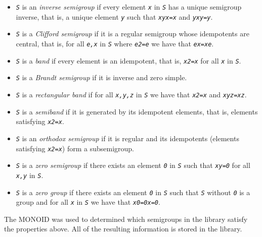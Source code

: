 \documentclass[a4paper,11pt]{report}
\begin{document}
{{\begin{itemize}
\item  \mbox{\texttt{\slshape S}} is an \emph{inverse semigroup} if every element \mbox{\texttt{\slshape x}} in \mbox{\texttt{\slshape S}} has a unique semigroup inverse, that is, a unique element \mbox{\texttt{\slshape y}} such that \mbox{\texttt{\slshape xyx=x}} and \mbox{\texttt{\slshape yxy=y}}. 
\item  \mbox{\texttt{\slshape S}} is a \emph{Clifford semigroup} if it is a regular semigroup whose idempotents are central, that is, for all \mbox{\texttt{\slshape e,x}} in \mbox{\texttt{\slshape S}} where \mbox{\texttt{\slshape e\texttt{}2=e}} we have that \mbox{\texttt{\slshape ex=xe}}. 
\item  \mbox{\texttt{\slshape S}} is a \emph{band} if every element is an idempotent, that is, \mbox{\texttt{\slshape x\texttt{}2=x}} for all \mbox{\texttt{\slshape x}} in \mbox{\texttt{\slshape S}}.
\item  \mbox{\texttt{\slshape S}} is a \emph{Brandt semigroup} if it is inverse and zero simple.
\item  \mbox{\texttt{\slshape S}} is a \emph{rectangular band} if for all \mbox{\texttt{\slshape x,y,z}} in \mbox{\texttt{\slshape S}} we have that \mbox{\texttt{\slshape x\texttt{}2=x}} and \mbox{\texttt{\slshape xyz=xz}}.
\item  \mbox{\texttt{\slshape S}} is a \emph{semiband} if it is generated by its idempotent elements, that is, elements satisfying \mbox{\texttt{\slshape x\texttt{}2=x}}.
\item  \mbox{\texttt{\slshape S}} is an \emph{orthodox semigroup} if it is regular and its idempotents (elements satisfying \mbox{\texttt{\slshape x\texttt{}2=x}}) form a subsemigroup.
\item \mbox{\texttt{\slshape S}} is a \emph{zero semigroup} if there exists an element \mbox{\texttt{\slshape 0}} in \mbox{\texttt{\slshape S}} such that \mbox{\texttt{\slshape xy=0}} for all \mbox{\texttt{\slshape x,y}} in \mbox{\texttt{\slshape S}}.
\item \mbox{\texttt{\slshape S}} is a \emph{zero group} if there exists an element \mbox{\texttt{\slshape 0}} in \mbox{\texttt{\slshape S}} such that \mbox{\texttt{\slshape S}} without \mbox{\texttt{\slshape 0}} is a group and for all \mbox{\texttt{\slshape x}} in \mbox{\texttt{\slshape S}} we have that \mbox{\texttt{\slshape x0=0x=0}}.
\end{itemize}
 The \textsf{MONOID} was used to determined which semigroups in the library satisfy the properties
above. All of the resulting information is stored in the library. 

}}
\end{document}
